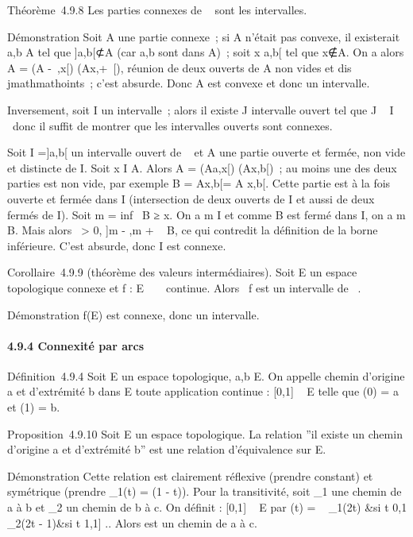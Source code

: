\documentclass[]{article}
\begin{document}
Théorème~4.9.8 Les parties connexes de ~ sont les intervalles.

Démonstration Soit A une partie connexe~; si A n'était pas convexe, il
existerait a,b \in A tel que {]}a,b{[}⊄A (car a,b sont dans A)~; soit x
\in{]}a,b{[} tel que x∉A. On a alors A = (A\bigcap{]}
-\infty~,x{[}) \cup (A\bigcap{]}x,+\infty~{[}), réunion de deux ouverts de A non vides et
dis\\jmathmathoints~; c'est absurde. Donc A est convexe et donc un intervalle.

Inversement, soit I un intervalle~; alors il existe J intervalle ouvert
tel que J \subset~ I \subset~\overlineJ donc il suffit de montrer
que les intervalles ouverts sont connexes.

Soit I ={]}a,b{[} un intervalle ouvert de ~ et A une partie ouverte et
fermée, non vide et distincte de I. Soit x \in I \diagdown A. Alors A =
(A\bigcap{]}a,x{[}) \cup (A\bigcap{]}x,b{[})~; au moins une des deux parties est non
vide, par exemple B = A\bigcap{]}x,b{[}= A \bigcap {[}x,b{[}. Cette partie est à la
fois ouverte et fermée dans I (intersection de deux ouverts de I et
aussi de deux fermés de I). Soit m = inf~ B ≥
x. On a m \in I et comme B est fermé dans I, on a m \in B. Mais alors
\exists~\epsilon \textgreater{} 0, {]}m - \epsilon,m + \epsilon{[}\subset~ B, ce
qui contredit la définition de la borne inférieure. C'est absurde, donc
I est connexe.

Corollaire~4.9.9 (théorème des valeurs intermédiaires). Soit E un espace
topologique connexe et f : E \rightarrow~ ~ continue. Alors
\mathrmIm~f est un
intervalle de ~.

Démonstration f(E) est connexe, donc un intervalle.

\paragraph{4.9.4 Connexité par arcs}

Définition~4.9.4 Soit E un espace topologique, a,b \in E. On appelle
chemin d'origine a et d'extrémité b dans E toute application continue \gamma
: {[}0,1{]} \rightarrow~ E telle que \gamma(0) = a et \gamma(1) = b.

Proposition~4.9.10 Soit E un espace topologique. La relation ''il existe
un chemin d'origine a et d'extrémité b'' est une relation d'équivalence
sur E.

Démonstration Cette relation est clairement réflexive (prendre \gamma
constant) et symétrique (prendre \gamma_1(t) = \gamma(1 - t)). Pour la
transitivité, soit \gamma_1 une chemin de a à b et \gamma_2 un
chemin de b à c. On définit \gamma : {[}0,1{]} \rightarrow~ E par \gamma(t) =
\left \ \cases
\gamma_1(2t) &si t \in {[}0,1\diagup2{]} \cr \gamma_2(2t
- 1)&si t \in {[}1,1{]} \cr  \right ..
Alors \gamma est un chemin de a à c.
\end{document}
